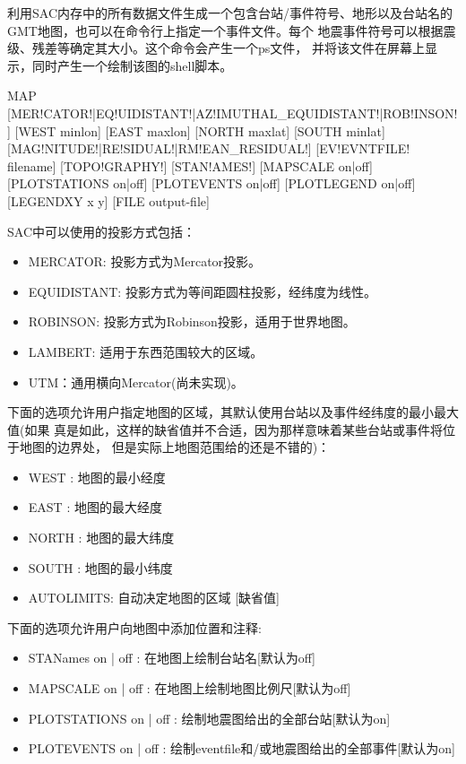 \label{cmd:map}

利用SAC内存中的所有数据文件生成一个包含台站/事件符号、地形以及台站名的
GMT地图，也可以在命令行上指定一个事件文件。每个
地震事件符号可以根据震级、残差等确定其大小。这个命令会产生一个ps文件，
并将该文件在屏幕上显示，同时产生一个绘制该图的shell脚本。

\begin{SACSTX}
MAP [MER!CATOR!|EQ!UIDISTANT!|AZ!IMUTHAL_EQUIDISTANT!|ROB!INSON!]
    [WEST minlon] [EAST maxlon] [NORTH maxlat] [SOUTH minlat]
    [MAG!NITUDE!|RE!SIDUAL!|RM!EAN_RESIDUAL!] [EV!EVNTFILE! filename]
    [TOPO!GRAPHY!] [STAN!AMES!] [MAPSCALE on|off] [PLOTSTATIONS on|off]
    [PLOTEVENTS on|off] [PLOTLEGEND on|off] [LEGENDXY x y]
    [FILE output-file]
\end{SACSTX}

SAC中可以使用的投影方式包括：
\begin{itemize}
\item MERCATOR:	投影方式为Mercator投影。
\item EQUIDISTANT: 投影方式为等间距圆柱投影，经纬度为线性。
\item ROBINSON: 投影方式为Robinson投影，适用于世界地图。
\item LAMBERT: 适用于东西范围较大的区域。
\item UTM：通用横向Mercator(尚未实现)。
\end{itemize}

下面的选项允许用户指定地图的区域，其默认使用台站以及事件经纬度的最小最大值(如果
真是如此，这样的缺省值并不合适，因为那样意味着某些台站或事件将位于地图的边界处，
但是实际上地图范围给的还是不错的)：
\begin{itemize}
\item WEST :  地图的最小经度
\item EAST : 地图的最大经度
\item NORTH : 地图的最大纬度
\item SOUTH : 地图的最小纬度
\item AUTOLIMITS:  自动决定地图的区域 [缺省值]
\end{itemize}

下面的选项允许用户向地图中添加位置和注释:
\begin{itemize}
\item STANames on | off :  在地图上绘制台站名[默认为off]
\item MAPSCALE on | off :  在地图上绘制地图比例尺[默认为off]
\item PLOTSTATIONS on | off : 绘制地震图给出的全部台站[默认为on]
\item PLOTEVENTS on | off : 绘制eventfile和/或地震图给出的全部事件[默认为on]
\end{itemize}

